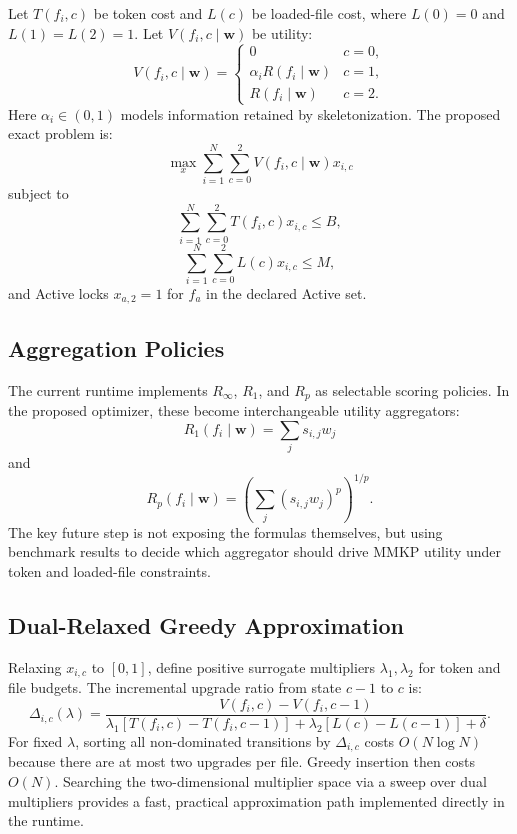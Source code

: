 \documentclass[11pt,onecolumn]{article}
\begin{document}
Let $T(f_i,c)$ be token cost and $L(c)$ be loaded-file cost, where $L(0)=0$ and $L(1)=L(2)=1$. Let $V(f_i,c \mid \mathbf{w})$ be utility:
\begin{equation}
V(f_i,c \mid \mathbf{w}) =
\begin{cases}
0 & c=0,\\
\alpha_i R(f_i \mid \mathbf{w}) & c=1,\\
R(f_i \mid \mathbf{w}) & c=2.
\end{cases}
\end{equation}
Here $\alpha_i \in (0,1)$ models information retained by skeletonization. The proposed exact problem is:
\begin{equation}
\max_x \sum_{i=1}^{N} \sum_{c=0}^{2} V(f_i,c \mid \mathbf{w})x_{i,c}
\end{equation}
subject to
\begin{equation}
\sum_{i=1}^{N} \sum_{c=0}^{2} T(f_i,c)x_{i,c} \le B,
\end{equation}
\begin{equation}
\sum_{i=1}^{N} \sum_{c=0}^{2} L(c)x_{i,c} \le M,
\end{equation}
and Active locks $x_{a,2}=1$ for $f_a$ in the declared Active set.

\subsection{Aggregation Policies}
The current runtime implements $R_\infty$, $R_1$, and $R_p$ as selectable scoring policies. In the proposed optimizer, these become interchangeable utility aggregators:
\begin{equation}
R_1(f_i \mid \mathbf{w}) = \sum_j s_{i,j}w_j
\end{equation}
and
\begin{equation}
R_p(f_i \mid \mathbf{w}) = \left(\sum_j (s_{i,j}w_j)^p\right)^{1/p}.
\end{equation}
The key future step is not exposing the formulas themselves, but using benchmark results to decide which aggregator should drive MMKP utility under token and loaded-file constraints.

\subsection{Dual-Relaxed Greedy Approximation}
Relaxing $x_{i,c}$ to $[0,1]$, define positive surrogate multipliers $\lambda_1,\lambda_2$ for token and file budgets. The incremental upgrade ratio from state $c-1$ to $c$ is:
\begin{equation}
\Delta_{i,c}(\lambda) =
\frac{V(f_i,c)-V(f_i,c-1)}
{\lambda_1[T(f_i,c)-T(f_i,c-1)] + \lambda_2[L(c)-L(c-1)] + \delta}.
\end{equation}
For fixed $\lambda$, sorting all non-dominated transitions by $\Delta_{i,c}$ costs $O(N\log N)$ because there are at most two upgrades per file. Greedy insertion then costs $O(N)$. Searching the two-dimensional multiplier space via a sweep over dual multipliers provides a fast, practical approximation path implemented directly in the runtime.
\end{document}
